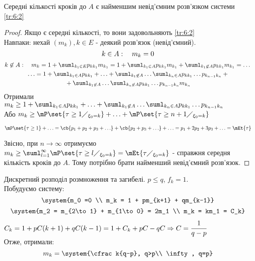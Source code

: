 \begin{teor}
Середні кількості кроків до $A$ є найменшим невід’ємним розв’язком системи \eqref{tr:6:2}
\end{teor}
\begin{proof}
Якщо є середні кількості, то вони задовольняють \eqref{tr:6:2}\\
Навпаки: нехай $(m_k),k\in E$ - деякий розв’язок (невід’ємний).
\begin{equation*}
k\in A:\quad m_k=0\\
\end{equation*}
\begin{multline*}
k\not\in A:\quad m_k = 1 + \suml_{k_1\in E} p_{kk_1} m_{k_1} = 1 + \suml_{k_1\in A} p_{kk_1} m_{k_1} + \suml_{k_1\not\in A}p_{kk_1} m_{k_1}= \ldots {}\\{}\ldots= 1 + \suml_{k_1\in A} p_{kk_1} + \ldots + \suml_{k_1\not\in A} \ldots\suml_{k_n\in A} p_{kk_1}\ldots p_{k_{n-1}k_n} +{}\\{}+ \suml_{k_1\not\in A} \ldots\suml_{k_n\not\in A} p_{kk_1}\ldots p_{k_{n-1}k_n} m_{k_n} 
\end{multline*}
Отримали $m_k \geq 1 + \suml_{k_1\in A} p_{kk_1} + \ldots + \suml_{k_1\not\in A} \ldots\suml_{k_n\in A} p_{kk_1}\ldots p_{k_{n-1}k_n}$\\
Або $m_k \geq \mP\set{\tau\geq 1\diagup_{\xi_0=k}} + \ldots + \mP\set{\tau\geq n+1\diagup_{\xi_0=k}}$
\begin{war}
$\mP\set{\tau\geq 1} + \ldots  = \cb{p_1+ p_2 + p_3 + \ldots} + \cb{p_2 + p_3 +\ldots} +\ldots = p_1 + 2p_2 + 3p_3 + \ldots = \mEt{\tau}$
\end{war}
\noindent Звісно, при $n\to\infty$ отримуємо $m_k \geq \suml_{l=1}^\infty \mP\set{\tau\geq l\diagup_{\xi_0=k}} = \mEt{\tau\diagup_{\xi_0=k}}$ - справжня середня кількість кроків до $A$. Тому потрібно брати найменший невід’ємний розв’язок.
\end{proof}
\begin{exs}
Дискретний розподіл розмноження та загибелі. $p\leq q$, $f_k=1$.\\
Побудуємо систему:
\begin{equation}
	\system{m_0 =0 \\ m_k = 1 + pm_{k+1} + qm_{k-1}}
\end{equation}
\begin{equation}
	\system{m_2 = m_{2\to 1} + m_{1\to 0} = 2m_1 \\ m_k = km_1 = C_k}
\end{equation}
$C_k = 1 + p C(k+1) + q C(k-1) = 1 + C_k + pC - qC \Rightarrow C = \cfrac1{q-p}$\\
Отже, отримали:
\begin{equation}
	m_k = \system{\cfrac k{q-p}, q>p\\ \infty , q=p}
\end{equation}
\end{exs}


